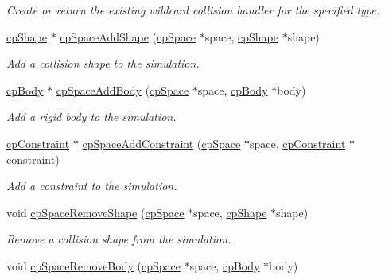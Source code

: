 \begin{DoxyCompactItemize}
\begin{DoxyCompactList}\small\item\em Create or return the existing wildcard collision handler for the specified type. \end{DoxyCompactList}\item 
\hyperlink{structcp_shape}{cp\+Shape} $\ast$ \hyperlink{group__cp_space_ga5fd6bdb0b93c93a93eeab0611e070080}{cp\+Space\+Add\+Shape} (\hyperlink{structcp_space}{cp\+Space} $\ast$space, \hyperlink{structcp_shape}{cp\+Shape} $\ast$shape)
\begin{DoxyCompactList}\small\item\em Add a collision shape to the simulation. \end{DoxyCompactList}\item 
\hypertarget{group__cp_space_ga0aa27863e6410512b73347e25e97b215}{}\hyperlink{structcp_body}{cp\+Body} $\ast$ \hyperlink{group__cp_space_ga0aa27863e6410512b73347e25e97b215}{cp\+Space\+Add\+Body} (\hyperlink{structcp_space}{cp\+Space} $\ast$space, \hyperlink{structcp_body}{cp\+Body} $\ast$body)\label{group__cp_space_ga0aa27863e6410512b73347e25e97b215}

\begin{DoxyCompactList}\small\item\em Add a rigid body to the simulation. \end{DoxyCompactList}\item 
\hypertarget{group__cp_space_gad3fc61e25869131d30dca7b1a33ba102}{}\hyperlink{structcp_constraint}{cp\+Constraint} $\ast$ \hyperlink{group__cp_space_gad3fc61e25869131d30dca7b1a33ba102}{cp\+Space\+Add\+Constraint} (\hyperlink{structcp_space}{cp\+Space} $\ast$space, \hyperlink{structcp_constraint}{cp\+Constraint} $\ast$constraint)\label{group__cp_space_gad3fc61e25869131d30dca7b1a33ba102}

\begin{DoxyCompactList}\small\item\em Add a constraint to the simulation. \end{DoxyCompactList}\item 
\hypertarget{group__cp_space_gaba39a56c766cf5094876685d7ed63734}{}void \hyperlink{group__cp_space_gaba39a56c766cf5094876685d7ed63734}{cp\+Space\+Remove\+Shape} (\hyperlink{structcp_space}{cp\+Space} $\ast$space, \hyperlink{structcp_shape}{cp\+Shape} $\ast$shape)\label{group__cp_space_gaba39a56c766cf5094876685d7ed63734}

\begin{DoxyCompactList}\small\item\em Remove a collision shape from the simulation. \end{DoxyCompactList}\item 
\hypertarget{group__cp_space_gad2c0aab926b1796bb38deee21d8a9ef1}{}void \hyperlink{group__cp_space_gad2c0aab926b1796bb38deee21d8a9ef1}{cp\+Space\+Remove\+Body} (\hyperlink{structcp_space}{cp\+Space} $\ast$space, \hyperlink{structcp_body}{cp\+Body} $\ast$body)\label{group__cp_space_gad2c0aab926b1796bb38deee21d8a9ef1}


\end{DoxyCompactItemize}
